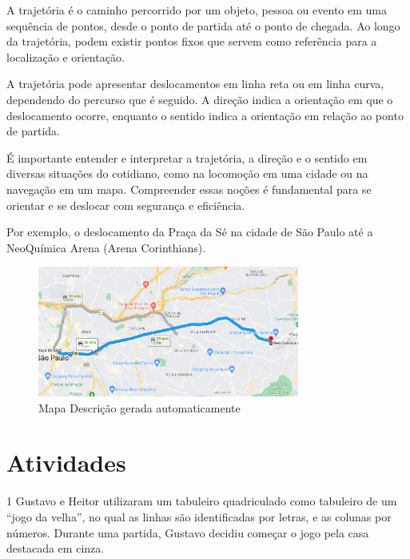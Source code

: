 \begin{escolha}
\begin{escolha}
\begin{escolha}
\begin{escolha}
{\begin{boxmedio}
\begin{boxpeq}
\begin{q°}
\begin{boxmedio}
\begin{boxpeq}
\begin{boxpeq}
\begin{boxmedio}
\begin{boxmedio}
\begin{boxmedio}
{A trajetória é o caminho percorrido por um objeto, pessoa ou evento em
uma sequência de pontos, desde o ponto de partida até o ponto de
chegada. Ao longo da trajetória, podem existir pontos fixos que servem
como referência para a localização e orientação.

A trajetória pode apresentar deslocamentos em linha reta ou em linha
curva, dependendo do percurso que é seguido. A direção indica a
orientação em que o deslocamento ocorre, enquanto o sentido indica a
orientação em relação ao ponto de partida.

É importante entender e interpretar a trajetória, a direção e o sentido
em diversas situações do cotidiano, como na locomoção em uma cidade ou
na navegação em um mapa. Compreender essas noções é fundamental para se
orientar e se deslocar com segurança e eficiência.

Por exemplo, o deslocamento da Praça da Sé na cidade de São Paulo até a
NeoQuímica Arena (Arena Corinthians).

\begin{figure}
\centering
\includegraphics[width=3.39062in,height=1.68534in]{./_SAEB_9_MAT/media/image196.png}
\caption{Mapa Descrição gerada automaticamente}
\end{figure}


}

\section{Atividades}

\num{1} Gustavo e Heitor utilizaram um tabuleiro quadriculado como tabuleiro
de um ``jogo da velha'', no qual as linhas são identificadas por letras,
e as colunas por números. Durante uma partida, Gustavo decidiu começar
o jogo pela casa destacada em cinza.


\end{boxmedio}
\end{boxmedio}
\end{boxmedio}
\end{boxpeq}
\end{boxpeq}
\end{boxmedio}
\end{q°}
\end{boxpeq}
\end{boxmedio}}
\end{escolha}
\end{escolha}
\end{escolha}
\end{escolha}
